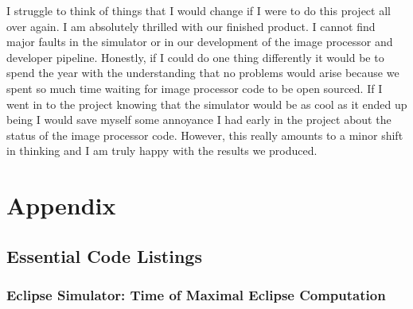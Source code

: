 \documentclass[10pt, onecolumn, draftclsnofoot, letterpaper, compsoc]{IEEEtran}
\begin{document}
I struggle to think of things that I would change if I were to do this project
all over again. I am absolutely thrilled with our finished product. I cannot
find major faults in the simulator or in our development of the image processor
and developer pipeline. Honestly, if I could do one thing differently it would be
to spend the year with the understanding that no problems would arise because we
spent so much time waiting for image processor code to be open sourced. If I went
in to the project knowing that the simulator would be as cool as it ended up being
I would save myself some annoyance I had early in the project about the status of
the image processor code. However, this really amounts to a minor shift in thinking
and I am truly happy with the results we produced.

\newpage
\section{Appendix}

\subsection{Essential Code Listings}

\subsubsection{Eclipse Simulator: Time of Maximal Eclipse Computation}
\end{document}
